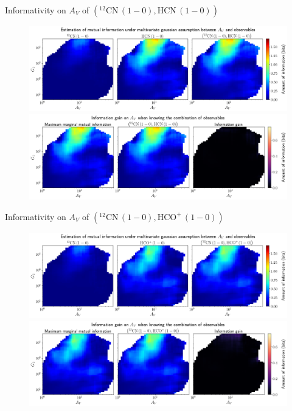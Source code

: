 \documentclass{beamer}
\begin{document}
\begin{frame}{Informativity on $A_V$ of $\left(\mathrm{^{12}CN\,(1-0)},\mathrm{HCN\,(1-0)}\right)$}
    \begin{figure}
        \centering
        \includegraphics[width=0.95\linewidth]{../linearinfogauss/av__12cn10_hcn10_linearinfogauss.png}
        \vfill
        \includegraphics[width=0.95\linewidth]{../linearinfogauss/av__12cn10_hcn10_linearinfogauss_gain.png}
    \end{figure}
\end{frame}

\begin{frame}{Informativity on $A_V$ of $\left(\mathrm{^{12}CN\,(1-0)},\mathrm{HCO^+\,(1-0)}\right)$}
    \begin{figure}
        \centering
        \includegraphics[width=0.95\linewidth]{../linearinfogauss/av__12cn10_hcop10_linearinfogauss.png}
        \vfill
        \includegraphics[width=0.95\linewidth]{../linearinfogauss/av__12cn10_hcop10_linearinfogauss_gain.png}
    \end{figure}
\end{frame}
\end{document}
